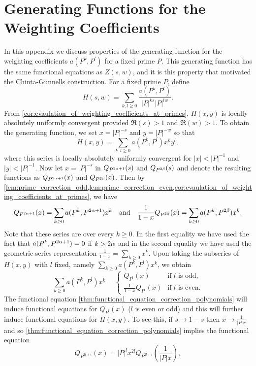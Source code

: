 \documentclass[12pt,reqno,oneside]{amsart}
\begin{document}
\appendix
\section*{Generating Functions for the Weighting Coefficients}
    In this appendix we discuss properties of the generating function for the weighting coefficients $a(P^{k},P^{l})$ for a fixed prime $P$. This generating function has the same functional equations as $Z(s,w)$, and it is this property that motivated the Chinta-Gunnells construction. For a fixed prime $P$, define
    \[
        H(s,w) = \sum_{k,l \ge 0}\frac{a(P^{k},P^{l})}{|P|^{ks}|P|^{lw}}.
    \]
    From \cref{cor:evaulation_of_weighting_coefficients_at_primes}, $H(x,y)$ is locally absolutely uniformly convergent provided $\Re(s) > 1$ and $\Re(w) > 1$. To obtain the generating function, we set $x = |P|^{-s}$ and $y = |P|^{-w}$ so that
    \[
        H(x,y) = \sum_{k,l \ge 0}a(P^{k},P^{l})x^{k}y^{l},
    \]
    where this series is locally absolutely uniformly convergent for $|x| < |P|^{-1}$ and $|y| < |P|^{-1}$. Now let $x = |P|^{-s}$ in $Q_{P^{2\alpha+1}}(s)$ and $Q_{P^{2\beta}}(s)$ and denote the resulting functions as $Q_{P^{2\alpha+1}}(x)$ and $Q_{P^{2\beta}}(x)$. Then by \cref{lem:prime_correction_odd,lem:prime_correction_even,cor:evaulation_of_weighting_coefficients_at_primes}, we have
    \[
        Q_{P^{2\alpha+1}}(x) = \sum_{k \ge 0}a(P^{k},P^{2\alpha+1})x^{k} \quad \text{and} \quad \frac{1}{1-x}Q_{P^{2\beta}}(x) = \sum_{k \ge 0}a(P^{k},P^{2\beta})x^{k}.
    \]
    Note that these series are over every $k \ge 0$. In the first equality we have used the fact that $a(P^{k},P^{2\alpha+1}) = 0$ if $k > 2\alpha$ and in the second equality we have used the geometric series representation $\frac{1}{1-x} = \sum_{k \ge 0}x^{k}$. Upon taking the subseries of $H(x,y)$ with $l$ fixed, namely $\sum_{k \ge 0}a(P^{k},P^{l})x^{k}$, we obtain
    \[
        \sum_{k \ge 0}a(P^{k},P^{l})x^{k} = \begin{cases} Q_{P^{l}}(x) & \text{if $l$ is odd}, \\ \frac{1}{1-x}Q_{P^{l}}(x) & \text{if $l$ is even}. \end{cases}
    \]
    The functional equation \cref{thm:functional_equation_correction_polynomials} will induce functional equations for $Q_{P^{l}}(x)$ ($l$ is even or odd) and this will further induce functional equations for $H(x,y)$. To see this, if $s \to 1-s$ then $x \to \frac{1}{|P|x}$ and so \cref{thm:functional_equation_correction_polynomials} implies the functional equation
    \[
        Q_{P^{2l+i}}(x) = |P|^{l}x^{2l}Q_{P^{2l+i}}\left(\frac{1}{|P|x}\right),
    \]
\end{document}
